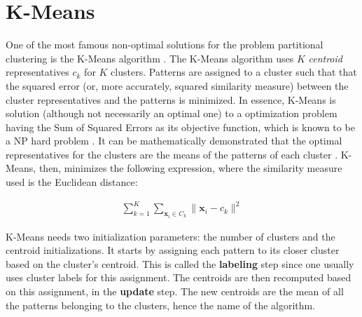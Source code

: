 


\section{K-Means}

One of the most famous non-optimal solutions for the problem partitional clustering is the K-Means algorithm \cite{kmeansoriginal}.
The K-Means algorithm uses $K$ \emph{centroid} representatives $c_k$ for $K$ clusters.
Patterns are assigned to a cluster such that that the squared error (or, more accurately, squared similarity measure) between the cluster representatives and the patterns is minimized.
In essence, K-Means is solution (although not necessarily an optimal one) to a optimization problem having the Sum of Squared Errors as its objective function, which is known to be a NP hard problem \cite{Jain2010}.
It can be mathematically demonstrated that the optimal representatives for the clusters are the means of the patterns of each cluster \cite{Aggarwal2014}.
K-Means, then, minimizes the following expression, where the similarity measure used is the Euclidean distance:

\begin{align}
    \sum^K_{k=1} \sum_{\mathbf{x}_i \in C_k} \| \mathbf{x}_i - c_k  \| ^2  \label{eq:sse}
\end{align}

K-Means needs two initialization parameters: the number of clusters and the centroid initializations.
It starts by assigning each pattern to its closer cluster based on the cluster's centroid.
This is called the \textbf{labeling} step since one usually uses cluster labels for this assignment.
The centroids are then recomputed based on this assignment, in the \textbf{update} step.
The new centroids are the mean of all the patterns belonging to the clusters, hence the name of the algorithm.

